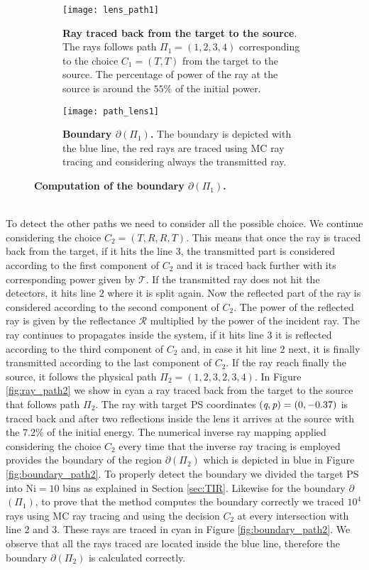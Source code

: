 \begin{figure}[t]
\centering
\begin{subfigure}[t]{.45\textwidth}
  \texttt{[image: lens\_path1]}
 \caption{\textbf{Ray traced back from the target to the source}. The rays follows path $\Pi_1 = (1,2,3,4)$ corresponding to the choice $C_1=(T,T)$ from the target to the source. The percentage of power of the ray at the source is around the $55\%$ of the initial power.}
  \label{fig:ray_path1}
\end{subfigure}%
\hfill
\begin{subfigure}[t]{.45\textwidth}
  \texttt{[image: path\_lens1]}
  \caption{\textbf{Boundary $\partial$$(\Pi_1)$.} The boundary is depicted with the blue line, the red rays are traced using MC ray tracing and considering always the transmitted ray.} %
  \label{fig:boundary_path1}
\end{subfigure} %
\caption{\textbf{Computation of the boundary $\partial$$(\Pi_1)$.}}
\end{figure}
\\ \indent To detect the other paths we need to consider all the possible choice. We continue considering the choice $C_2 = (T, R, R, T)$. This means that once the ray is traced back from the target, if it hits the line $3$, the transmitted part is considered according to the first component of $C_2$ and it is traced back further with its corresponding power given by $\mathcal{T}$. If the transmitted ray does not hit the detectors, it hits line $2$ where it is split again. Now the reflected part of the ray is considered according to the second component of $C_2$. The power of the reflected ray is given by the reflectance $\mathcal{R}$ multiplied by the power of the incident ray. The ray continues to propagates inside the system, if it hits line $3$ it is reflected according to the third component of $C_2$ and, in case it hit line $2$ next, it is finally transmitted according to the last component of $C_2$. If the ray reach finally the source, it follows the physical path $\Pi_2 = (1,2,3,2,3,4)$. 
In Figure \ref{fig:ray_path2} we show in cyan a ray traced back from the target to the source that follows path $\Pi_2$. The ray with target PS coordinates $(\textit{q}, \textit{p})=(0,-0.37)$ is traced back and after two reflections inside the lens it arrives at the source with the $7.2\%$ of the initial energy. The numerical inverse ray mapping applied considering the choice $C_2$ every time that the inverse ray tracing is employed provides the boundary of the region $\partial$$(\Pi_2)$ which is depicted in blue in Figure \ref{fig:boundary_path2}. To properly detect the boundary we divided the target PS into $\textrm{Ni}=10$ bins as explained in Section \ref{sec:TIR}. Likewise for the boundary $\partial$$(\Pi_1)$, to prove that the method computes the boundary correctly we traced $10^4$ rays using MC ray tracing and using the decision $C_2$ at every intersection with line $2$ and $3$. These rays are traced in cyan in Figure \ref{fig:boundary_path2}. We observe that all the rays traced are located inside the blue line, therefore the boundary $\partial$$(\Pi_2)$ is calculated correctly.

